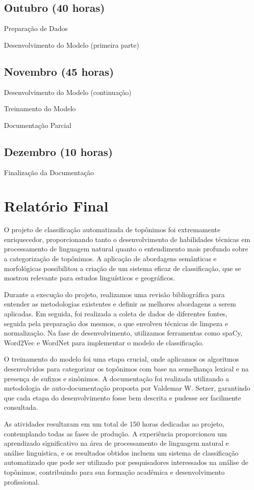 \documentclass{article}
\begin{document}
\subsection*{Outubro (40 horas)}

Preparação de Dados

Desenvolvimento do Modelo (primeira parte)

\subsection*{Novembro (45 horas)}

Desenvolvimento do Modelo (continuação)

Treinamento do Modelo

Documentação Parcial

\subsection*{Dezembro (10 horas)}

Finalização da Documentação

\section*{Relatório Final}
O projeto de classificação automatizada de topônimos foi extremamente enriquecedor, proporcionando tanto o desenvolvimento de habilidades técnicas em processamento de linguagem natural quanto o entendimento mais profundo sobre a categorização de topônimos. A aplicação de abordagens semânticas e morfológicas possibilitou a criação de um sistema eficaz de classificação, que se mostrou relevante para estudos linguísticos e geográficos.

Durante a execução do projeto, realizamos uma revisão bibliográfica para entender as metodologias existentes e definir as melhores abordagens a serem aplicadas. Em seguida, foi realizada a coleta de dados de diferentes fontes, seguida pela preparação dos mesmos, o que envolveu técnicas de limpeza e normalização. Na fase de desenvolvimento, utilizamos ferramentas como spaCy, Word2Vec e WordNet para implementar o modelo de classificação.

O treinamento do modelo foi uma etapa crucial, onde aplicamos os algoritmos desenvolvidos para categorizar os topônimos com base na semelhança lexical e na presença de sufixos e sinônimos. A documentação foi realizada utilizando a metodologia de auto-documentação proposta por Valdemar W. Setzer, garantindo que cada etapa do desenvolvimento fosse bem descrita e pudesse ser facilmente consultada.

As atividades resultaram em um total de 150 horas dedicadas ao projeto, contemplando todas as fases de produção. A experiência proporcionou um aprendizado significativo na área de processamento de linguagem natural e análise linguística, e os resultados obtidos incluem um sistema de classificação automatizado que pode ser utilizado por pesquisadores interessados na análise de topônimos, contribuindo para sua formação acadêmica e desenvolvimento profissional.
\end{document}
